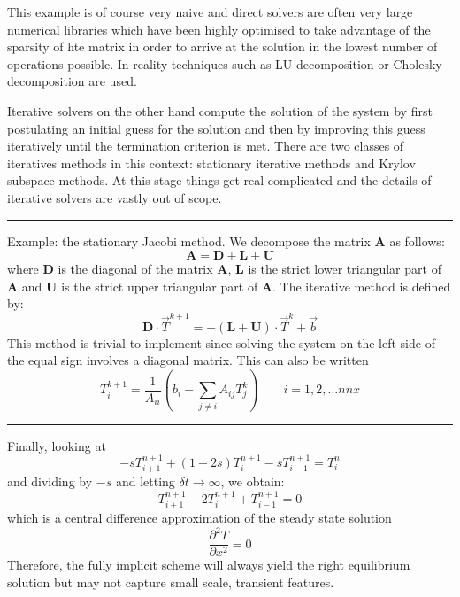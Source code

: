 This example is of course very naive and direct solvers are often very large 
numerical libraries which have been highly optimised to take advantage of the 
sparsity of hte matrix in order to arrive at the solution in the lowest 
number of operations possible. 
In reality techniques such as LU-decomposition or Cholesky decomposition are used. 


Iterative solvers on the other hand compute the solution of the system 
by first postulating an initial guess for the solution and then by 
improving this guess iteratively until the {\color{olive} termination criterion}
is met. There are two classes of iteratives methods in this context: 
{\color{olive} stationary iterative methods} and 
{\color{olive} Krylov subspace methods}.
At this stage things get real complicated and the details of iterative solvers 
are vastly out of scope.  



\begin{center}
\begin{minipage}[t]{0.77\textwidth}
\par\noindent\rule{\textwidth}{0.4pt}
{\color{blue} Example}: the stationary Jacobi method. 
We decompose the matrix ${\bm A}$ as follows:
\[
{\bm A} = {\bm D} + {\bm L} + {\bm U} 
\] 
where ${\bm D}$ is the diagonal of the matrix ${\bm A}$, ${\bm L}$ is the 
strict lower triangular part of ${\bm A}$ and 
${\bm U}$ is the strict upper triangular part of ${\bm A}$.
The iterative method is defined by:
\[
{\bm D} \cdot \vec{T}^{k+1} = -({\bm L} + {\bm U}) \cdot \vec{T}^k + \vec{b}
\]
This method is trivial to implement since solving the system on the 
left side of the equal sign involves a diagonal matrix.
This can also be written 
\[
T_i^{k+1} = \frac{1}{A_{ii}} \left(b_i - \sum_{j\neq i} A_{ij} T_j^k \right)
\qquad
i=1,2,...nnx
\]



 

\par\noindent\rule{\textwidth}{0.4pt}
\end{minipage}
\end{center}





Finally, looking at
\[
-s T_{i+1}^{n+1} + (1+2s) T_{i}^{n+1} - s T_{i-1}^{n+1} = T_i^{n}
\]
and dividing by $-s$ and letting $\delta t \rightarrow \infty$, we obtain:
\[
T_{i+1}^{n+1} -2 T_{i}^{n+1} + T_{i-1}^{n+1} = 0
\]
which is a central difference approximation of the steady state solution
\[
\frac{\partial^2 T }{\partial x^2}=0
\]
Therefore, the fully implicit scheme will always yield the right equilibrium solution 
but may not capture small scale, transient features.


